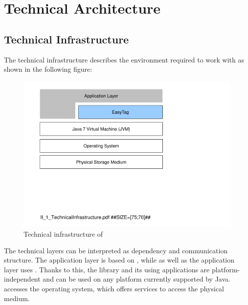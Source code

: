 
\chapter{Technical Architecture}
\label{sec:TechnicalArchitectureChap}


\section{Technical Infrastructure}
\label{sec:TechnicalInfrastructure}

The technical infrastructure describes the environment required to work with \LibName{} as shown in the following figure:

\begin{figure}[H]
	\centering
		\includegraphics[width=1.00\textwidth]{Figures/Part_II/II_1_TechnicalInfrastructure.pdf}
		\caption{Technical infrastructure of \LibName{}}
	\label{fig:5_3_SCH_TechnicalInfrastructure}
\end{figure}

The technical layers can be interpreted as dependency and communication structure. The application layer is based on \LibName{}, while \LibName{} as well as the application layer uses \JavaVersion{}. Thanks to this, the library and its using applications are platform-independent and can be used on any platform currently supported by Java. \JavaVersion{} accesses the operating system, which offers services to access the physical medium.


